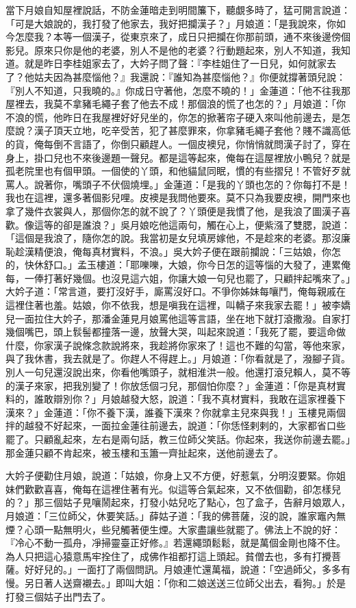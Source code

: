 當下月娘自知屋裡說話，不防金蓮暗走到明間簾下，聽覷多時了，猛可開言說道：「可是大娘說的，我打發了他家去，我好把攔漢子？」月娘道：「是我說來，你如今怎麼我？本等一個漢子，從東京來了，成日只把攔在你那前頭，通不來後邊傍個影兒。原來只你是他的老婆，別人不是他的老婆？行動題起來，別人不知道，我知道。就是昨日李桂姐家去了，大妗子問了聲：『李桂姐住了一日兒，如何就家去了？他姑夫因為甚麼惱他？』我還說：『誰知為甚麼惱他？』你便就撐著頭兒說：『別人不知道，只我曉的。』你成日守著他，怎麼不曉的！」金蓮道：「他不往我那屋裡去，我莫不拿豬毛繩子套了他去不成！那個浪的慌了也怎的？」月娘道：「你不浪的慌，他昨日在我屋裡好好兒坐的，你怎的掀著帘子硬入來叫他前邊去，是怎麼說？漢子頂天立地，吃辛受苦，犯了甚麼罪來，你拿豬毛繩子套他？賤不識高低的貨，俺每倒不言語了，你倒只顧趕人。一個皮襖兒，你悄悄就問漢子討了，穿在身上，掛口兒也不來後邊題一聲兒。都是這等起來，俺每在這屋裡放小鴨兒？就是孤老院里也有個甲頭。一個使的丫頭，和他貓鼠同眠，慣的有些摺兒！不管好歹就罵人。說著你，嘴頭子不伏個燒埋。」金蓮道：「是我的丫頭也怎的？你每打不是！我也在這裡，還多著個影兒哩。皮襖是我問他要來。莫不只為我要皮襖，開門來也拿了幾件衣裳與人，那個你怎的就不說了？丫頭便是我慣了他，是我浪了圖漢子喜歡。像這等的卻是誰浪？」吳月娘吃他這兩句，觸在心上，便紫漒了雙腮，說道：「這個是我浪了，隨你怎的說。我當初是女兒填房嫁他，不是趁來的老婆。那沒廉恥趁漢精便浪，俺每真材實料，不浪。」吳大妗子便在跟前攔說：「三姑娘，你怎的，快休舒口。」孟玉樓道：「耶嚛嚛，大娘，你今日怎的這等惱的大發了，連累俺每，一俸打著好幾個。也沒見這六姐，你讓大娘一句兒也罷了，只顧拌起嘴來了。」大妗子道：「常言道，要打沒好手，廝罵沒好口。不爭你姊妹每嚷鬥，俺每親戚在這裡住著也羞。姑娘，你不依我，想是嗔我在這裡，叫轎子來我家去罷！」被李嬌兒一面拉住大妗子，那潘金蓮見月娘罵他這等言語，坐在地下就打滾撒潑。自家打幾個嘴巴，頭上䯼髻都撞落一邊，放聲大哭，叫起來說道：「我死了罷，要這命做什麼，你家漢子說條念款說將來，我趁將你家來了！這也不難的勾當，等他來家，與了我休書，我去就是了。你趕人不得趕上。」月娘道：「你看就是了，潑腳子貨。別人一句兒還沒說出來，你看他嘴頭子，就相淮洪一般。他還打滾兒賴人，莫不等的漢子來家，把我別變了！你放恁個刁兒，那個怕你麼？」金蓮道：「你是真材實料的，誰敢辯別你？」月娘越發大怒，說道：「我不真材實料，我敢在這家裡養下漢來？」金蓮道：「你不養下漢，誰養下漢來？你就拿主兒來與我！」玉樓見兩個拌的越發不好起來，一面拉金蓮往前邊去，說道：「你恁怪剌剌的，大家都省口些罷了。只顧亂起來，左右是兩句話，教三位師父笑話。你起來，我送你前邊去罷。」那金蓮只顧不肯起來，被玉樓和玉簫一齊扯起來，送他前邊去了。

大妗子便勸住月娘，說道：「姑娘，你身上又不方便，好惹氣，分明沒要緊。你姐妹們歡歡喜喜，俺每在這裡住著有光。似這等合氣起來，又不依個勸，卻怎樣兒的？」那三個姑子見嚷鬧起來，打發小姑兒吃了點心，包了盒子，告辭月娘眾人，月娘道：「三位師父，休要笑話。」薛姑子道：「我的佛菩薩，沒的說，誰家竈內無煙？心頭一點無明火，些兒觸著便生煙。大家盡讓些就罷了。佛法上不說的好：『冷心不動一孤舟，凈掃靈臺正好修。』若還繩頭鬆鬆，就是萬個金剛也降不住。為人只把這心猿意馬牢拴住了，成佛作祖都打這上頭起。貧僧去也，多有打攪菩薩。好好兒的。」一面打了兩個問訊。月娘連忙還萬福，說道：「空過師父，多多有慢。另日著人送齋襯去。」即叫大姐：「你和二娘送送三位師父出去，看狗。」於是打發三個姑子出門去了。

